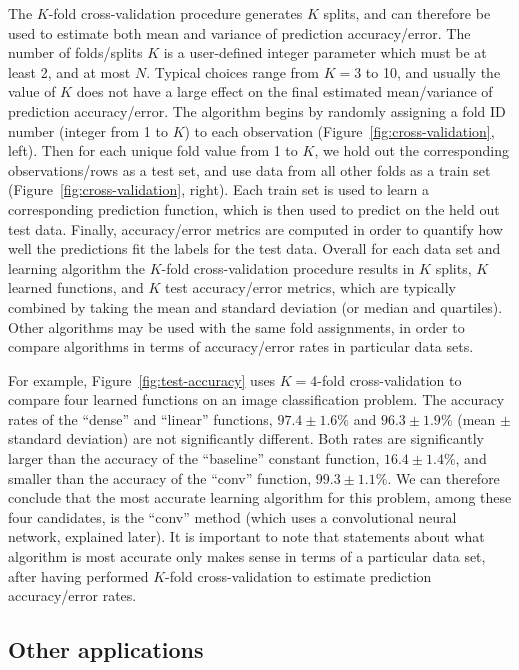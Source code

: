 \documentclass[12pt]{article}
\begin{document}
The $K$-fold cross-validation procedure generates $K$ splits, and can
therefore be used to estimate both mean and variance of prediction
accuracy/error. The number of folds/splits $K$ is a user-defined
integer parameter which must be at least 2, and at most $N$. Typical
choices range from $K=3$ to 10, and usually the value of $K$ does not
have a large effect on the final estimated mean/variance of prediction
accuracy/error. The algorithm begins by randomly assigning a fold ID
number (integer from 1 to $K$) to each observation
(Figure~\ref{fig:cross-validation}, left). Then for each unique fold
value from 1 to $K$, we hold out the corresponding observations/rows
as a test set, and use data from all other folds as a train set
(Figure~\ref{fig:cross-validation}, right). Each train set is used to
learn a corresponding prediction function, which is then used to
predict on the held out test data. Finally, accuracy/error metrics are
computed in order to quantify how well the predictions fit the labels
for the test data. Overall for each data set and learning algorithm
the $K$-fold cross-validation procedure results in $K$ splits, $K$
learned functions, and $K$ test accuracy/error metrics, which are
typically combined by taking the mean and standard deviation (or
median and quartiles). Other algorithms may be used with the same fold
assignments, in order to compare algorithms in terms of accuracy/error
rates in particular data sets.

For example, Figure~\ref{fig:test-accuracy} uses $K=4$-fold
cross-validation to compare four learned functions on an image
classification problem. The accuracy rates of the ``dense'' and
``linear'' functions, $97.4 \pm 1.6 \%$ and $96.3 \pm 1.9 \%$ (mean
$\pm$ standard deviation) are not significantly different. Both rates
are significantly larger than the accuracy of the ``baseline''
constant function, $16.4 \pm 1.4 \%$, and smaller than the accuracy of
the ``conv'' function, $99.3 \pm 1.1 \%$. We can therefore conclude
that the most accurate learning algorithm for this problem, among
these four candidates, is the ``conv'' method (which uses a
convolutional neural network, explained later).  It is important to
note that statements about what algorithm is most accurate only makes
sense in terms of a particular data set, after having performed
$K$-fold cross-validation to estimate prediction accuracy/error rates.

\subsection{Other applications}
\end{document}
